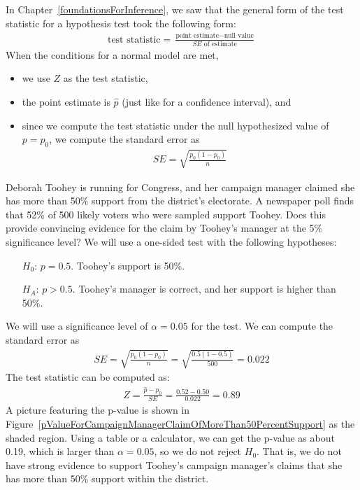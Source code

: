 In Chapter~\ref{foundationsForInference}, we saw that the general form of the test statistic for a hypothesis test took the following form:
\begin{align*}
\text{test statistic} = \frac{\text{point estimate} - \text{null value}}{SE \text{ of estimate}}
\end{align*}
When the conditions for a normal model are met,
\begin{itemize}
\item we use $Z$ as the test statistic,
\item the point estimate is $\hat{p}$ (just like for a confidence interval), and
\item since we compute the test statistic under the null hypothesized value of $p = p_0$, we compute the standard error as
\begin{align*}
SE = \sqrt{\frac{p_0(1-p_0)}{n}}
\end{align*}
\end{itemize}

\begin{example}{Deborah Toohey is running for Congress, and her campaign manager claimed she has more than 50\% support from the district's electorate. A newspaper poll finds that 52\% of 500 likely voters who were sampled support Toohey. Does this provide convincing evidence for the claim by Toohey's manager at the 5\% significance level?}\label{TooheyInferenceExample}
We will use a one-sided test with the following hypotheses:
\begin{itemize}
\item[$H_0$:] $p = 0.5$. Toohey's support is 50\%.
\item[$H_A$:] $p > 0.5$. Toohey's manager is correct, and her support is higher than 50\%.
\end{itemize}
We will use a significance level of $\alpha = 0.05$ for the test. We can compute the standard error as
\begin{align*}
SE = \sqrt{\frac{p_0 (1 - p_0)}{n}} = \sqrt{\frac{0.5 (1 - 0.5)}{500}} = 0.022
\end{align*}
The test statistic can be computed as:
\begin{align*}
Z = \frac{\hat{p} - p_0}{SE} = \frac{0.52 - 0.50}{0.022} = 0.89
\end{align*}
A picture featuring the p-value is shown in Figure~\ref{pValueForCampaignManagerClaimOfMoreThan50PercentSupport} as the shaded region. Using a table or a calculator, we can get the p-value as about 0.19, which is larger than $\alpha = 0.05$, so we do not reject $H_0$. That is, we do not have strong evidence to support Toohey's campaign manager's claims that she has more than 50\% support within the district.
\end{example}


